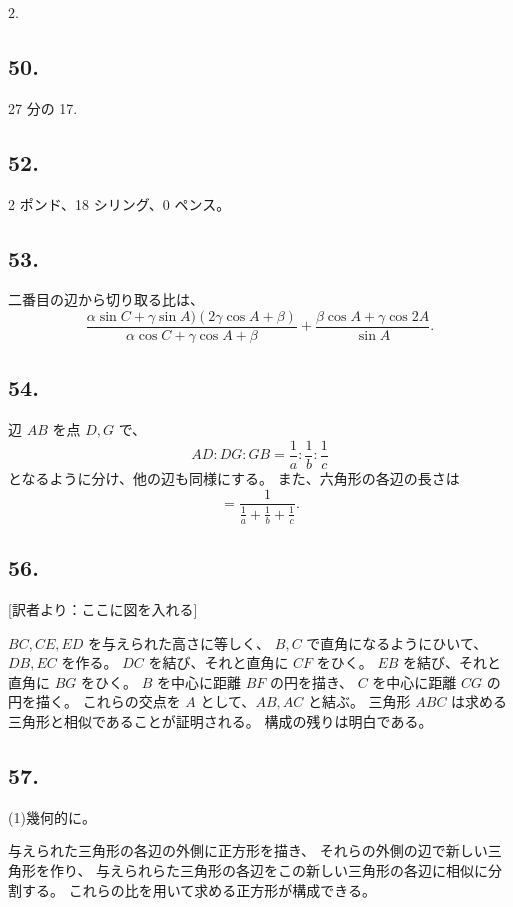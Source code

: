 $2$.


\subsection*{50.}

27 分の 17.

\subsection*{52.}

2 ポンド、18 シリング、0 ペンス。

\subsection*{53.}

二番目の辺から切り取る比は、
\[
\frac{\alpha \sin C + \gamma \sin A)(2 \gamma \cos A + \beta)}
{\alpha \cos C + \gamma \cos A + \beta}
+
\frac{\beta \cos A + \gamma \cos 2A}{\sin A}
.
\]


\subsection*{54.}

辺 $AB$ を点 $D, G$ で、
\[
AD : DG : GB = \frac{1}{a} : \frac{1}{b} : \frac{1}{c}
\]
となるように分け、他の辺も同様にする。
また、六角形の各辺の長さは
\[
= \frac{1}{\frac{1}{a} + \frac{1}{b} + \frac{1}{c}}.
\]

\subsection*{56.}

[訳者より：ここに図を入れる]

$BC, CE, ED$ を与えられた高さに等しく、
$B, C$ で直角になるようにひいて、$DB, EC$ を作る。
$DC$ を結び、それと直角に $CF$ をひく。
$EB$ を結び、それと直角に $BG$ をひく。
$B$ を中心に距離 $BF$ の円を描き、
$C$ を中心に距離 $CG$ の円を描く。
これらの交点を $A$ として、$AB, AC$ と結ぶ。
三角形 $ABC$ は求める三角形と相似であることが証明される。
構成の残りは明白である。


\subsection*{57.}

(1)幾何的に。

与えられた三角形の各辺の外側に正方形を描き、
それらの外側の辺で新しい三角形を作り、
与えられらた三角形の各辺をこの新しい三角形の各辺に相似に分割する。
これらの比を用いて求める正方形が構成できる。


